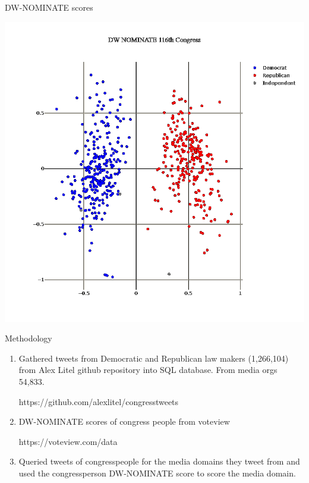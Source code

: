 \documentclass[12pt]{article}
\theoremstyle{example}
\theoremstyle{defn}
\begin{document}
\vfill


\clearpage

{\large DW-NOMINATE scores}

\vspace*{-5pt}
\hspace*{\fill}
\includegraphics[scale=0.2]{dwnominate_pic_white.png}
\hspace*{\fill}

\clearpage

{\large Methodology}

\vspace*{-16pt}
\begin{enumerate}
\item Gathered tweets from Democratic and Republican law makers (1,266,104) from Alex Litel github repository into SQL database.  From media orgs 54,833.

https://github.com/alexlitel/congresstweets

\item DW-NOMINATE scores of congress people from voteview

https://voteview.com/data
\item Queried tweets of congresspeople for the media domains they tweet from and used the congressperson DW-NOMINATE score to score the media domain.
\end{enumerate}
\end{document}
